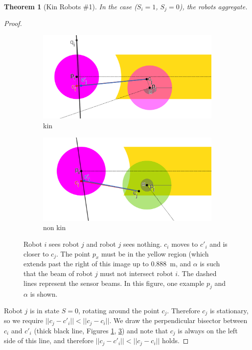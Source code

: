 \documentclass[letterpaper, 10 pt, conference]{ieeeconf}
\newtheorem{theorem}{Theorem}
\begin{document}
\begin{theorem}[Kin Robots \#1]\label{thm:kin_1}
  In the case ($S_i=1$, $S_j=0$), the robots aggregate.
\end{theorem}
\begin{proof}
  \begin{figure}[t]
    \centering
    \begin{subfigure}[t]{1\columnwidth}
      \includegraphics[width=1\columnwidth]{./images/kin_1}
      \caption{kin}
      \label{fig:kin_1}
    \end{subfigure}

    \begin{subfigure}[t]{1\columnwidth}
      \includegraphics[width=1\columnwidth]{./images/non_kin_1}
      \caption{non kin}
      \label{fig:non_kin_1}
    \end{subfigure}

    \caption{Robot $i$ sees robot $j$ and robot $j$ sees nothing. $c_i$ moves to $c'_i$ and is closer to $c_j$. The point $p_x$ must be in the yellow region (which extends past the right of this image up to \SI{0.888}{\meter}, and $\alpha$ is such that the beam of robot $j$ must not intersect robot $i$. The dashed lines represent the sensor beams. In this figure, one example $p_j$ and $\alpha$ is shown.}
  \end{figure}

  Robot $j$ is in state $S=0$, rotating around the point $c_j$. Therefore $c_j$ is stationary, so we require $||c_j- c'_i|| < ||c_j- c_i||$. We draw the perpendicular bisector between $c_i$ and $c'_i$ (thick black line, Figures \ref{fig:kin_1}, \ref{fig:non_kin_1}) and note that $c_j$ is always on the left side of this line, and therefore $||c_j- c'_i|| < ||c_j- c_i||$ holds.
\end{proof}
\end{document}
